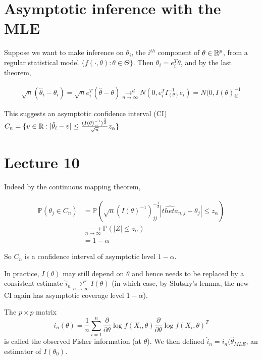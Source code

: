 \documentclass[a4paper]{article}
\begin{document}
\section{Asymptotic inference with the MLE}

Suppose we want to make inference on $\theta_i$, the $i^{th}$ component of $\theta \in \mathbb{R}^{p}$, from a regular statistical model $\{f\left( \cdot , \theta \right) : \theta \in \Theta \}$. Then $\theta_i = e_i ^{T} \theta$, and by the last theorem,

\begin{align*}
	\sqrt{n} (\hat{\theta}_i - \theta_i) = \sqrt{n} e_i ^{T} (\hat{\theta} - \theta) \underset{n\to \infty}{\to ^{d}} N(0, e_i ^{T} I_(\theta)^{-1} e_i) = N(0, I(\theta)^{-1}_{ii}  
\end{align*}

This suggests an asymptotic confidence interval (CI) $C_n = \{v \in \mathbb{R} : |\hat{\theta}_i - v| \le  \frac{(I(\theta)^{-1}_{ii})^{\frac{1}{2}}}{\sqrt{n} } z_{\alpha}\} $

\section*{Lecture 10}

Indeed by the continuous mapping theorem,

\begin{align*}
	\mathbb{P}\left( \theta_j \in C_n \right) &= \mathbb{P}\left( \sqrt{n} (I(\theta)^{-1})^{- \frac{1}{2}}_{jj}  |\hat{theta}_{n,j} - \theta_j| \le  z_{\alpha}\right) \\
	&\underset{n\to \infty}{\to } \mathbb{P}\left( |Z| \le z_{\alpha} \right) \\
	&= 1- \alpha
\end{align*}

So $C_n$ is a confidence interval of asymptotic level $1-\alpha$.

In practice,  $I(\theta)$ may still depend on  $\theta$ and hence needs to be replaced by a consistent estimate $\hat{i}_{n} \underset{n\to \infty}{\to ^{P}}  I(\theta)$ (in which case, by Slutsky's lemma, the new CI again has asymptotic coverage level $1-\alpha$).

 \begin{defn}
	The $p\times p$ matrix
	\[
		i_n(\theta) = \frac{1}{n}\sum_{i=1}^{n} \frac{\partial }{\partial \theta} \log f(X_i, \theta) \frac{\partial }{\partial \theta} \log f(X_i, \theta)^{T} 
	\] 
	is called the observed Fisher information (at $\theta$).
	We then defined  $\hat{i}_n = i_n(\hat{\theta}_{MLE}$, an estimator of $I(\theta_0)$.
\end{defn}
\end{document}
